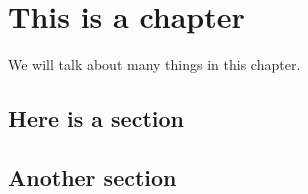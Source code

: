 \chapter{This is a chapter}

We will talk about many things in this chapter.

\section{Here is a section}

\section{Another section}
